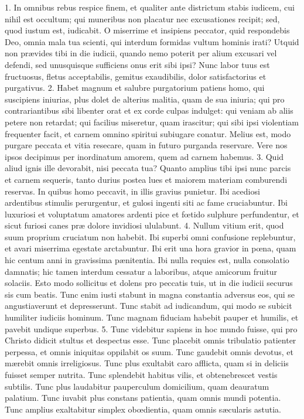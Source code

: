 \documentclass[twoside]{article}
\begin{document}
1. In omnibus rebus respice finem, et qualiter ante districtum stabis iudicem, cui nihil est occultum; qui muneribus non placatur nec excusationes recipit; sed, quod iustum est, iudicabit. O miserrime et insipiens peccator, quid respondebis Deo, omnia mala tua scienti, qui interdum formidas vultum hominis irati? Utquid non prævides tibi in die iudicii, quando nemo poterit per alium excusari vel defendi, sed unusquisque sufficiens onus erit sibi ipsi? Nunc labor tuus est fructuosus, fletus acceptabilis, gemitus exaudibilis, dolor satisfactorius et purgativus.
2. Habet magnum et salubre purgatorium patiens homo, qui suscipiens iniurias, plus dolet de alterius malitia, quam de sua iniuria; qui pro contrariantibus sibi libenter orat et ex corde culpas indulget: qui veniam ab aliis petere non retardat; qui facilius miseretur, quam irascitur; qui sibi ipsi violentiam frequenter facit, et carnem omnino spiritui subiugare conatur. Melius est, modo purgare peccata et vitia resecare, quam in futuro purganda reservare. Vere nos ipsos decipimus per inordinatum amorem, quem ad carnem habemus.
3. Quid aliud ignis ille devorabit, nisi peccata tua? Quanto amplius tibi ipsi nunc parcis et carnem sequeris, tanto durius postea lues et maiorem materiam comburendi reservas. In quibus homo peccavit, in illis gravius punietur. Ibi acediosi ardentibus stimulis perurgentur, et gulosi ingenti siti ac fame cruciabuntur. Ibi luxuriosi et voluptatum amatores ardenti pice et fœtido sulphure perfundentur, et sicut furiosi canes præ dolore invidiosi ululabunt.
4. Nullum vitium erit, quod suum proprium cruciatum non habebit. Ibi superbi omni confusione replebuntur, et avari miserrima egestate arctabuntur. Ibi erit una hora gravior in pœna, quam hic centum anni in gravissima pænitentia. Ibi nulla requies est, nulla consolatio damnatis; hic tamen interdum cessatur a laboribus, atque amicorum fruitur solaciis. Esto modo sollicitus et dolens pro peccatis tuis, ut in die iudicii securus sis cum beatis. Tunc enim iusti stabunt in magna constantia adversus eos, qui se angustiaverunt et depresserunt. Tunc stabit ad iudicandum, qui modo se subicit humiliter iudiciis hominum. Tunc magnam fiduciam habebit pauper et humilis, et pavebit undique superbus.
5. Tunc videbitur sapiens in hoc mundo fuisse, qui pro Christo didicit stultus et despectus esse. Tunc placebit omnis tribulatio patienter perpessa, et omnis iniquitas oppilabit os suum. Tunc gaudebit omnis devotus, et mærebit omnis irreligiosus. Tunc plus exultabit caro afflicta, quam si in deliciis fuisset semper nutrita. Tunc splendebit habitus vilis, et obtenebrescet vestis subtilis. Tunc plus laudabitur pauperculum domicilium, quam deauratum palatium. Tunc iuvabit plus constans patientia, quam omnis mundi potentia. Tunc amplius exaltabitur simplex obœdientia, quam omnis sæcularis astutia.
\end{document}
